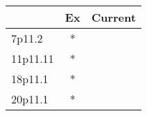 \begin{tabular}{lcc}
\toprule
{} & Ex & Current \\
\midrule
7p11.2   &  * &         \\
11p11.11 &  * &         \\
18p11.1  &  * &         \\
20p11.1  &  * &         \\
\bottomrule
\end{tabular}
